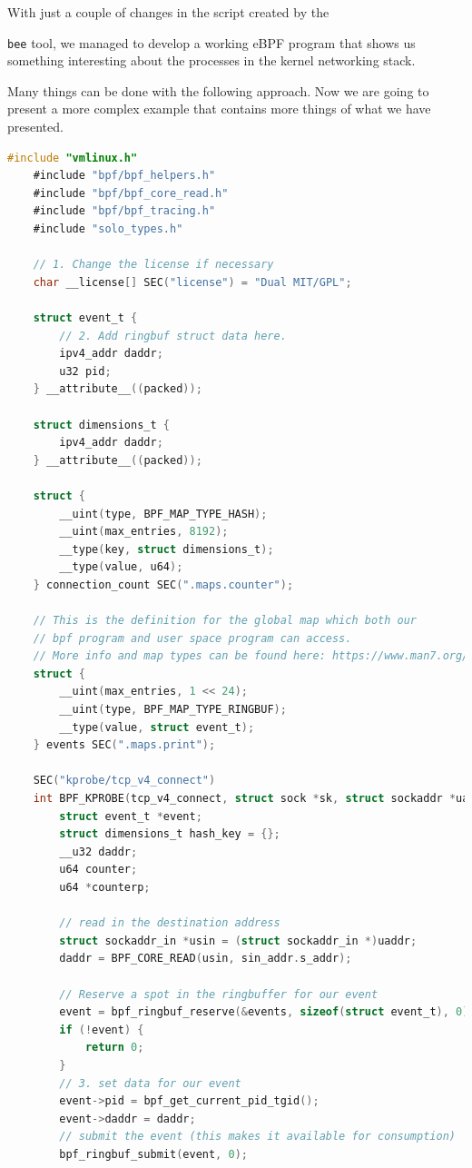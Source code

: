 With just a couple of changes in the script created by the \raggedright\colorbox{backcolour}{\lstinline[style=commandline, language=bash]|bee|} tool, we managed to develop a working eBPF program that shows us something interesting about the processes in the kernel networking stack.

Many things can be done with the following approach.
Now we are going to present a more complex example that contains more things of what we have presented.

\begin{lstlisting}[style=cstyle, language=C, caption={Code of the modified program starting from the first one created using \colorbox{backcolour}{\lstinline[style=commandline, language=bash]|bee|}.}]
	#include "vmlinux.h"
	#include "bpf/bpf_helpers.h"
	#include "bpf/bpf_core_read.h"
	#include "bpf/bpf_tracing.h"
	#include "solo_types.h"
	
	// 1. Change the license if necessary 
	char __license[] SEC("license") = "Dual MIT/GPL";
	
	struct event_t {
		// 2. Add ringbuf struct data here.
		ipv4_addr daddr;
		u32 pid;
	} __attribute__((packed));
	
	struct dimensions_t {
		ipv4_addr daddr;
	} __attribute__((packed));
	
	struct {
		__uint(type, BPF_MAP_TYPE_HASH);
		__uint(max_entries, 8192);
		__type(key, struct dimensions_t);
		__type(value, u64);
	} connection_count SEC(".maps.counter");
	
	// This is the definition for the global map which both our
	// bpf program and user space program can access.
	// More info and map types can be found here: https://www.man7.org/linux/man-pages/man2/bpf.2.html
	struct {
		__uint(max_entries, 1 << 24);
		__uint(type, BPF_MAP_TYPE_RINGBUF);
		__type(value, struct event_t);
	} events SEC(".maps.print");
	
	SEC("kprobe/tcp_v4_connect")
	int BPF_KPROBE(tcp_v4_connect, struct sock *sk, struct sockaddr *uaddr) {
		struct event_t *event;
		struct dimensions_t hash_key = {};
		__u32 daddr;
		u64 counter;
		u64 *counterp;
		
		// read in the destination address
		struct sockaddr_in *usin = (struct sockaddr_in *)uaddr;
		daddr = BPF_CORE_READ(usin, sin_addr.s_addr);
		
		// Reserve a spot in the ringbuffer for our event
		event = bpf_ringbuf_reserve(&events, sizeof(struct event_t), 0);
		if (!event) {
			return 0;
		}
		// 3. set data for our event
		event->pid = bpf_get_current_pid_tgid();
		event->daddr = daddr;
		// submit the event (this makes it available for consumption)
		bpf_ringbuf_submit(event, 0);
		

\end{lstlisting}
